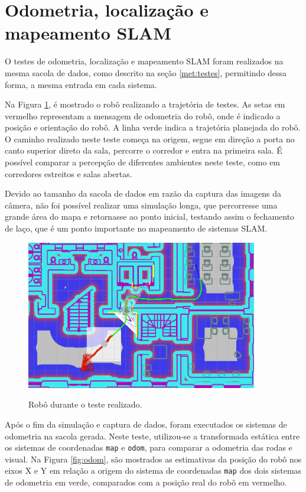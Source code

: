 \documentclass[repeatfields,xlists,xpacks,oneside,yearsonly]{ufrgscca}
\begin{document}
\section{Odometria, localização e mapeamento SLAM}

O testes de odometria, localização e mapeamento SLAM foram realizados na mesma
sacola de dados, como descrito na seção \ref{met:testes},
permitindo dessa forma, a mesma entrada em cada sistema.

Na Figura \ref{fig:base_bag}, é mostrado o robô realizando a trajetória
de testes. As setas em vermelho representam a mensagem de odometria do
robô, onde é indicado a posição e orientação do robô. A linha verde indica
a trajetória planejada do robô.
O caminho realizado neste teste começa na origem, segue em direção a porta
no canto superior direto da sala, percorre o corredor e entra na primeira
sala.
É possível comparar a percepção de diferentes ambientes neste teste, como
em corredores estreitos e salas abertas.

Devido ao tamanho da sacola de dados em razão da captura das imagens
da câmera, não foi possível realizar uma simulação longa, que percorresse
uma grande área do mapa e retornasse ao ponto inicial, testando assim o
fechamento de laço, que é um ponto importante no mapeamento de sistemas
SLAM.

\begin{figure}[h]
    {
        \centering
        \caption{Robô durante o teste realizado.}
        \label{fig:base_bag}
        \includegraphics[width=0.9\textwidth]{base_bag_sim_zoom.png}\\
    }
\end{figure}

Após o fim da simulação e captura de dados, foram executados os
sistemas de odometria na sacola gerada.
Neste teste, utilizou-se a transformada estática entre os sistemas
de coordenadas \texttt{map} e \texttt{odom}, para comparar a odometria
das rodas e visual.
Na Figura \ref{fig:odom}, são mostrados as estimativas da posição do robô
nos eixos X e Y em relação a origem do sistema de coordenadas \texttt{map}
dos dois sistemas de odometria em verde, comparados com a posição real do
robô em vermelho.
\end{document}

